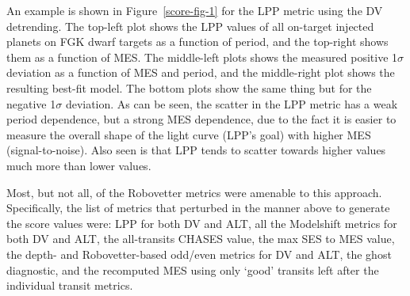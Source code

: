 An example is shown in Figure~\ref{score-fig-1} for the LPP metric using the DV detrending. The top-left plot shows the LPP values of all on-target injected planets on FGK dwarf targets as a function of period, and the top-right shows them as a function of MES. The middle-left plots shows the measured positive 1$\sigma$ deviation as a function of MES and period, and the middle-right plot shows the resulting best-fit model. The bottom plots show the same thing but for the negative 1$\sigma$ deviation. As can be seen, the scatter in the LPP metric has a weak period dependence, but a strong MES dependence, due to the fact it is easier to measure the overall shape of the light curve (LPP's goal) with higher MES (signal-to-noise). Also seen is that LPP tends to scatter towards higher values much more than lower values.

Most, but not all, of the Robovetter metrics were amenable to this approach. Specifically, the list of metrics that perturbed in the manner above to generate the score values were: LPP for both DV and ALT, all the Modelshift metrics for both DV and ALT, the all-transits CHASES value, the max SES to MES value, the depth- and Robovetter-based odd/even metrics for DV and ALT, the ghost diagnostic, and the recomputed MES using only `good' transits left after the individual transit metrics.

